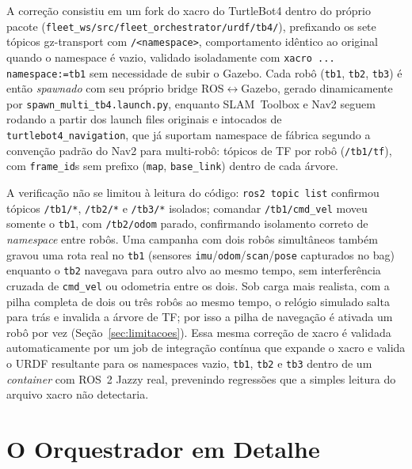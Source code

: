 A correção consistiu em um fork do xacro do TurtleBot4 dentro do próprio
pacote (\texttt{fleet\_\allowbreak ws/\allowbreak src/\allowbreak fleet\_\allowbreak orchestrator/\allowbreak urdf/\allowbreak tb4/}), prefixando os
sete tópicos gz-transport com \texttt{/<namespace>}, comportamento idêntico ao
original quando o namespace é vazio, validado isoladamente com
\texttt{xacro ... namespace:=tb1} sem necessidade de subir o Gazebo. Cada robô
(\texttt{tb1}, \texttt{tb2}, \texttt{tb3}) é então \textit{spawnado} com seu próprio bridge
ROS$\leftrightarrow$Gazebo, gerado dinamicamente por \texttt{spawn\_\allowbreak multi\_\allowbreak tb4.\allowbreak launch.\allowbreak py},
enquanto SLAM~Toolbox \cite{macenski2021slam} e Nav2 seguem rodando a partir dos launch files
originais e intocados de \texttt{turtlebot4\_\allowbreak navigation}, que já suportam
namespace de fábrica segundo a convenção padrão do Nav2 para multi-robô:
tópicos de TF por robô (\texttt{/tb1/\allowbreak tf}), com \texttt{frame\_\allowbreak id}s sem prefixo
(\texttt{map}, \texttt{base\_\allowbreak link}) dentro de cada árvore.

A verificação não se limitou à leitura do código: \texttt{ros2 topic list}
confirmou tópicos \texttt{/tb1/*}, \texttt{/tb2/*} e \texttt{/tb3/*} isolados; comandar
\texttt{/tb1/\allowbreak cmd\_\allowbreak vel} moveu somente o \texttt{tb1}, com \texttt{/tb2/\allowbreak odom} parado,
confirmando isolamento correto de \textit{namespace} entre robôs. Uma
campanha com dois robôs simultâneos também gravou uma rota real no
\texttt{tb1} (sensores \texttt{imu}/\texttt{odom}/\texttt{scan}/\texttt{pose} capturados no bag) enquanto o
\texttt{tb2} navegava para outro alvo ao mesmo tempo, sem interferência cruzada de
\texttt{cmd\_\allowbreak vel} ou odometria entre os dois. Sob carga mais realista, com a pilha completa de dois ou três robôs ao mesmo
tempo, o relógio simulado salta para trás e invalida a árvore de TF; por isso a
pilha de navegação é ativada um robô por vez (Seção~\ref{sec:limitacoes}). Essa mesma correção de xacro é validada
automaticamente por um job de integração contínua que expande o xacro e
valida o URDF resultante para os namespaces vazio, \texttt{tb1}, \texttt{tb2} e
\texttt{tb3} dentro de um \textit{container} com ROS~2 Jazzy real, prevenindo
regressões que a simples leitura do arquivo xacro não detectaria.

\section{O Orquestrador em Detalhe}
\label{sec:impl_orquestrador}

